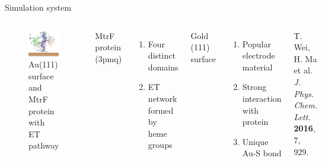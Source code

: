 \documentclass{beamer}
\begin{document}
\begin{frame}{Simulation system}
	\begin{columns}
		\begin{figure}
			\includegraphics[width=\columnwidth]{Pics/MtrF_path.png}
			\caption{Au(111) surface and MtrF protein with ET pathway}
		\end{figure}
			MtrF protein (3pmq) 
				\begin{enumerate}
					\item Four distinct domains
					\item ET network formed by heme groups
				\end{enumerate}   
			Gold (111) surface 
			\begin{enumerate}
				\item Popular electrode material
				\item Strong interaction with protein
				\item Unique Au-S bond
			\end{enumerate}
		\vspace{2cm}
		{\tiny T. Wei, H. Ma et al. \emph{J. Phys. Chem. Lett.} \textbf{2016}, 7, 929.}
	\end{columns}
\end{frame}
\end{document}
